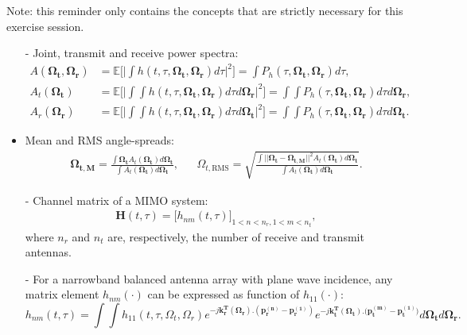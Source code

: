 \documentclass [a4paper, 11pt] {article}
\begin{document}
    \makesessiontitle
    
    \begin{reminder}
 
    Note: this reminder only contains the concepts that are strictly necessary for this exercise session.

\begin{itemize}
    \item[-] Joint, transmit and receive power spectra: 
    \begin{align}
    A(\mathbf{\Omega_t},\mathbf{\Omega_r}) &= \mathbb{E}\Big[ \Big|\int h(t,\tau, \mathbf{\Omega_t},\mathbf{\Omega_r}) d\tau  \Big|^2 \Big] = \int P_h(\tau, \mathbf{\Omega_t},\mathbf{\Omega_r}) d\tau,\\
    A_t(\mathbf{\Omega_t}) &= \mathbb{E}\Big[ \Big|\int \int h(t,\tau, \mathbf{\Omega_t},\mathbf{\Omega_r}) d\tau d\mathbf{\Omega_r}  \Big|^2 \Big] = \int \int P_h(\tau, \mathbf{\Omega_t},\mathbf{\Omega_r}) d\tau d\mathbf{\Omega_r},\\
    A_r(\mathbf{\Omega_r}) &= \mathbb{E}\Big[ \Big|\int \int h(t,\tau, \mathbf{\Omega_t},\mathbf{\Omega_r}) d\tau d\mathbf{\Omega_t}  \Big|^2 \Big] = \int \int P_h(\tau, \mathbf{\Omega_t},\mathbf{\Omega_r}) d\tau d\mathbf{\Omega_t}.
    \end{align}
    \item Mean and RMS angle-spreads: 
    \begin{align}
    \mathbf{\Omega_{t,M}} = \frac{\int \mathbf{\Omega_t} A_t(\mathbf{\Omega_t}) d\mathbf{\Omega_t}}{\int A_t(\mathbf{\Omega_t}) d\mathbf{\Omega_t}}, 
    && \Omega_{t,\text{RMS}} = \sqrt{\frac{\int \big| \big| \mathbf{\Omega_t} - \mathbf{\Omega_{t,M}} \big| \big|^2 A_t(\mathbf{\Omega_t}) d\mathbf{\Omega_t}}{\int A_t(\mathbf{\Omega_t}) d\mathbf{\Omega_t}}}.
    \end{align}
    \item[-] Channel matrix of a MIMO system: 
    \begin{align}
        \mathbf{H}(t,\tau) = \Big[h_{nm}(t,\tau) \Big]_{1<n<n_r,1<m<n_t },
    \end{align}
    where $n_r$ and $n_t$ are, respectively, the number of receive and transmit antennas. 
    \item[-] For a narrowband balanced antenna array with plane wave incidence, any matrix element $h_{nm}(\cdot)$ can be expressed as function of $h_{11}(\cdot)$:
    \begin{equation}
    h_{nm}(t,\tau) = \int \int h_{11}(t,\tau,\Omega_t,\Omega_r) e^{-j\mathbf{k_r^T}(\mathbf{\Omega_r}).(\mathbf{p^{(n)}_r} - \mathbf{p^{(1)}_r})} e^{-j\mathbf{k_t^T}(\mathbf{\Omega_t}).(\mathbf{p^{(m)}_t} - \mathbf{p^{(1)}_t)}} d\mathbf{\Omega_t} d\mathbf{\Omega_r}.

\end{equation}
\end{itemize}
\end{reminder}
\end{document}

